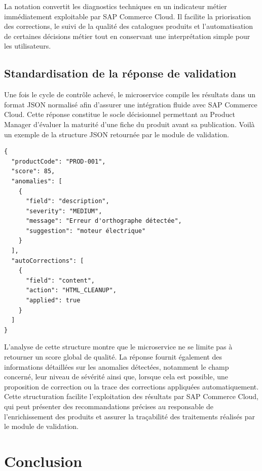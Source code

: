 La notation convertit les diagnostics techniques en un indicateur métier immédiatement exploitable par SAP Commerce Cloud. Il facilite la priorisation des corrections, le suivi de la qualité des catalogues produits et l'automatisation de certaines décisions métier tout en conservant une interprétation simple pour les utilisateurs.

\subsection{Standardisation de la réponse de validation}

Une fois le cycle de contrôle achevé, le microservice compile les résultats dans un format JSON normalisé afin d'assurer une intégration fluide avec SAP Commerce Cloud. Cette réponse constitue le socle décisionnel permettant au Product Manager d'évaluer la maturité d'une fiche du produit avant sa publication. 
Voilà un exemple de la structure JSON retournée par le module de validation.

\begin{tcolorbox}[
    colback=white,
    colframe=black,
    boxrule=0.8pt,
    arc=2mm,
    title=Exemple de réponse JSON du module de validation,
    fonttitle=\bfseries
]
\begin{verbatim}
{
  "productCode": "PROD-001",
  "score": 85,
  "anomalies": [
    {
      "field": "description",
      "severity": "MEDIUM",
      "message": "Erreur d'orthographe détectée",
      "suggestion": "moteur électrique"
    }
  ],
  "autoCorrections": [
    {
      "field": "content",
      "action": "HTML_CLEANUP",
      "applied": true
    }
  ]
}
\end{verbatim}
\end{tcolorbox}
\newpage

L'analyse de cette structure montre que le microservice ne se limite pas à retourner un score global de qualité. La réponse fournit également des informations détaillées sur les anomalies détectées, notamment le champ concerné, leur niveau de sévérité ainsi que, lorsque cela est possible, une proposition de correction ou la trace des corrections appliquées automatiquement. Cette structuration facilite l'exploitation des résultats par SAP Commerce Cloud, qui peut présenter des recommandations précises au responsable de l'enrichissement des produits et assurer la traçabilité des traitements réalisés par le module de validation.

\section{Conclusion}

